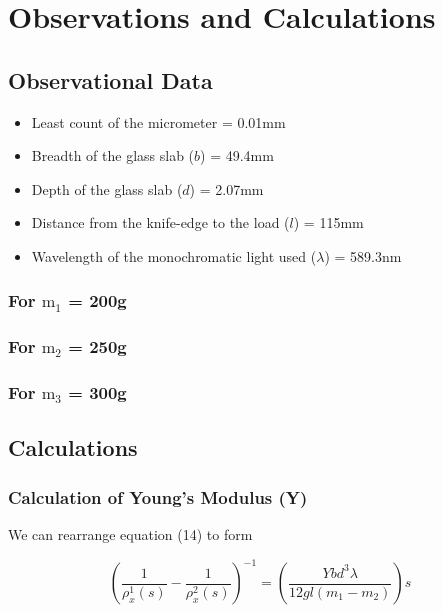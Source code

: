 \section{Observations and Calculations}

    \subsection{Observational Data}
    \begin{itemize}
        \item Least count of the micrometer = 0.01mm
        \item Breadth of the glass slab ($b$) = 49.4mm
        \item Depth of the glass slab ($d$) = 2.07mm
        \item Distance from the knife-edge to the load ($l$) = 115mm
        \item Wavelength of the monochromatic light used ($\lambda$) = 589.3nm
    \end{itemize}
    
    \subsubsection{For $\text{m}_1$ = 200g}
        
        

        
    \subsubsection{For $\text{m}_2$ = 250g}
        
        

    \subsubsection{For $\text{m}_3$ = 300g}
        
        

    \subsection{Calculations}
    \subsubsection{Calculation of Young's Modulus (Y)}

     We can rearrange equation (14) to form 

    \begin{equation}
        \left(\frac{1}{\rho_{x}^1(s)}-\frac{1}{\rho_{x}^2(s)}\right)^{-1} = \left(\frac{Ybd^3\lambda}{12gl(m_1-m_2)}\right)s
    \end{equation}

